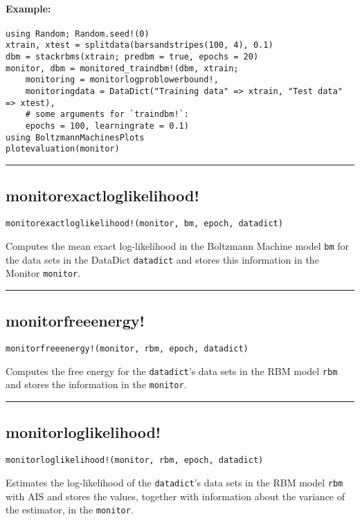 \paragraph*{Example:}
\begin{verbatim}
using Random; Random.seed!(0)
xtrain, xtest = splitdata(barsandstripes(100, 4), 0.1)
dbm = stackrbms(xtrain; predbm = true, epochs = 20)
monitor, dbm = monitored_traindbm!(dbm, xtrain;
    monitoring = monitorlogproblowerbound!,
    monitoringdata = DataDict("Training data" => xtrain, "Test data" => xtest),
    # some arguments for `traindbm!`:
    epochs = 100, learningrate = 0.1)
using BoltzmannMachinesPlots
plotevaluation(monitor)
\end{verbatim}
\noindent\rule{\textwidth}{1pt}
\subsection*{monitorexactloglikelihood!}
\begin{verbatim}
monitorexactloglikelihood!(monitor, bm, epoch, datadict)
\end{verbatim}
Computes the mean exact log-likelihood in the Boltzmann Machine model \texttt{bm} for the data sets in the DataDict \texttt{datadict} and stores this information in the Monitor \texttt{monitor}.

\noindent\rule{\textwidth}{1pt}
\subsection*{monitorfreeenergy!}
\begin{verbatim}
monitorfreeenergy!(monitor, rbm, epoch, datadict)
\end{verbatim}
Computes the free energy for the \texttt{datadict}'s data sets in the RBM model \texttt{rbm} and stores the information in the \texttt{monitor}.

\noindent\rule{\textwidth}{1pt}
\subsection*{monitorloglikelihood!}
\begin{verbatim}
monitorloglikelihood!(monitor, rbm, epoch, datadict)
\end{verbatim}
Estimates the log-likelihood of the \texttt{datadict}'s data sets in the RBM model \texttt{rbm} with AIS and stores the values, together with information about the variance of the estimator, in the \texttt{monitor}.

